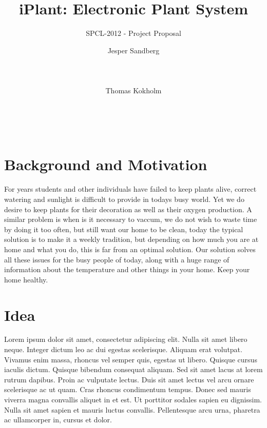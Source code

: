 \documentclass{ubicomp2012}
\begin{document}
\setlength{\paperheight}{11in}
\setlength{\paperwidth}{8.5in}
\setlength{\pdfpageheight}{\paperheight}
\setlength{\pdfpagewidth}{\paperwidth}




\title{iPlant: Electronic Plant System}
\subtitle{SPCL-2012 - Project Proposal}
\author{
  \alignauthor Jesper Sandberg\\
    \\
    \\
    \\
 \alignauthor Thomas Kokholm\\
    \\
    \\
    \\
      }
\maketitle

\section{Background and Motivation}
For years students and other individuals have failed to keep plants alive, correct watering and sunlight is difficult to provide
in todays busy world. Yet we do desire to keep plants for their decoration as well as their oxygen production. A similar problem
is when is it necessary to vaccum, we do not wish to waste time by doing it too often, but still want our home to be clean,
today the typical solution is to make it a weekly tradition, but depending on how much you are at home and what you do, this is
far from an optimal solution. Our solution solves all these issues for the busy people of today, along with a huge range of
information about the temperature and other things in your home. Keep your home healthy.

\section{Idea}
Lorem ipsum dolor sit amet, consectetur adipiscing elit. Nulla sit amet libero neque. Integer dictum leo ac dui egestas scelerisque. Aliquam erat volutpat. Vivamus enim massa, rhoncus vel semper quis, egestas ut libero. Quisque cursus iaculis dictum. Quisque bibendum consequat aliquam. Sed sit amet lacus at lorem rutrum dapibus. Proin ac vulputate lectus. Duis sit amet lectus vel arcu ornare scelerisque ac ut quam. Cras rhoncus condimentum tempus. Donec sed mauris viverra magna convallis aliquet in et est. Ut porttitor sodales sapien eu dignissim. Nulla sit amet sapien et mauris luctus convallis. Pellentesque arcu urna, pharetra ac ullamcorper in, cursus et dolor.
\end{document}
